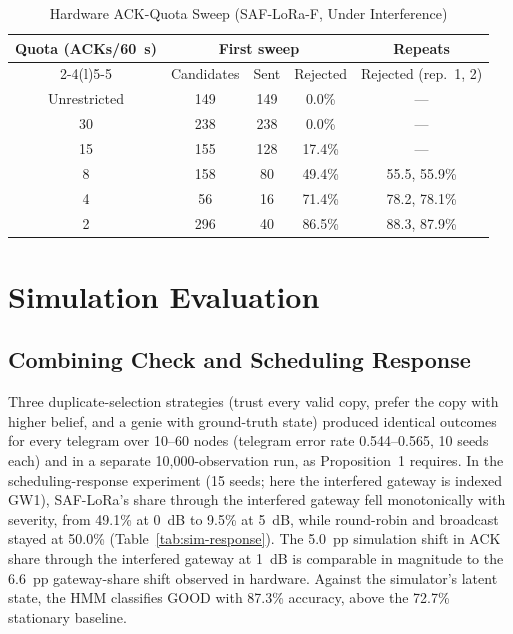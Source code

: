\documentclass[journal]{IEEEtran}
\begin{document}
\begin{table}[t]
\caption{Hardware ACK-Quota Sweep (SAF-LoRa-F, Under Interference)}
\label{tab:quota-hw}
\centering
\begin{tabular}{@{}ccccc@{}}
\toprule
\multirow{2}{*}{Quota (ACKs/60~s)} & \multicolumn{3}{c}{First sweep} & Repeats \\
\cmidrule(lr){2-4}\cmidrule(l){5-5}
 & Candidates & Sent & Rejected & Rejected (rep.\ 1, 2) \\
\midrule
Unrestricted & 149 & 149 & 0.0\% & --- \\
30 & 238 & 238 & 0.0\% & --- \\
15 & 155 & 128 & 17.4\% & --- \\
8 & 158 & 80 & 49.4\% & 55.5, 55.9\% \\
4 & 56 & 16 & 71.4\% & 78.2, 78.1\% \\
2 & 296 & 40 & 86.5\% & 88.3, 87.9\% \\
\bottomrule
\end{tabular}
\end{table}

\section{Simulation Evaluation}
\label{sec:sim-results}

\subsection{Combining Check and Scheduling Response}
\label{sec:results-sim}
Three duplicate-selection strategies (trust every valid copy, prefer the copy with higher belief, and a genie with ground-truth state) produced identical outcomes for every telegram over 10--60 nodes (telegram error rate 0.544--0.565, 10 seeds each) and in a separate 10{,}000-observation run, as Proposition~1 requires. In the scheduling-response experiment (15 seeds; here the interfered gateway is indexed GW1), SAF-LoRa's share through the interfered gateway fell monotonically with severity, from 49.1\% at 0~dB to 9.5\% at 5~dB, while round-robin and broadcast stayed at 50.0\% (Table~\ref{tab:sim-response}). The 5.0~pp simulation shift in ACK share through the interfered gateway at 1~dB is comparable in magnitude to the 6.6~pp gateway-share shift observed in hardware. Against the simulator's latent state, the HMM classifies GOOD with 87.3\% accuracy, above the 72.7\% stationary baseline.
\end{document}
